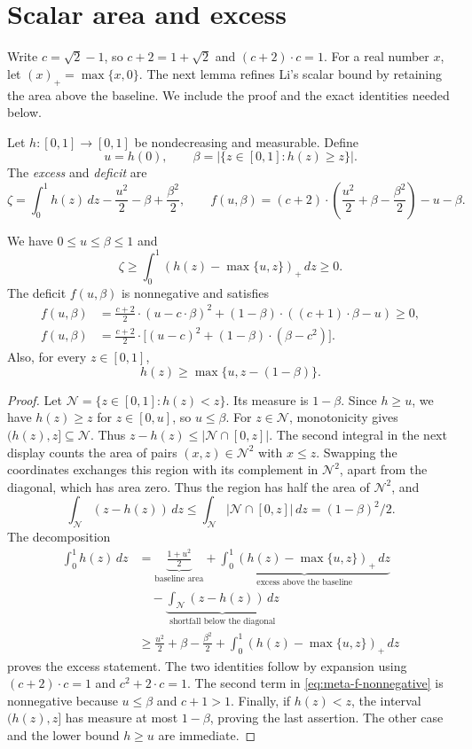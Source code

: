\section{Scalar area and excess}
\label{sec:meta-scalar}

Write $c=\sqrt2-1$, so $c+2=1+\sqrt2$ and $(c+2)\cdot c=1$.
For a real number $x$, let $(x)_+=\max\{x,0\}$.
The next lemma refines Li's scalar bound \cite[Claim 3.3]{Li2017} by
retaining the area above the baseline. We include the proof and the exact
identities needed below.

Let $h:[0,1]\to[0,1]$ be nondecreasing and measurable. Define
\[
 u=h(0),\qquad \beta=|\{z\in[0,1]:h(z)\ge z\}|.
\]
The \emph{excess} and \emph{deficit} are
\[
 \zeta=\int_0^1h(z)\,dz-\frac{u^2}{2}-\beta+\frac{\beta^2}{2},
 \qquad
 f(u,\beta)=(c+2)\cdot\left(\frac{u^2}{2}+\beta-\frac{\beta^2}{2}\right)-u-\beta.
\]

\begin{lemma}
\label{lem:meta-scalar-area}
We have $0\le u\le\beta\le1$ and
\[
 \zeta\ge\int_0^1(h(z)-\max\{u,z\})_+\,dz\ge0.
\]
The deficit $f(u,\beta)$ is nonnegative and satisfies
\begin{align}
 f(u,\beta)&=\frac{c+2}{2}\cdot(u-c\cdot\beta)^2+(1-\beta)\cdot((c+1)\cdot\beta-u)\ge0,
 \label{eq:meta-f-nonnegative}\\
 f(u,\beta)&=\frac{c+2}{2}\cdot\bigl[(u-c)^2+(1-\beta)\cdot(\beta-c^2)\bigr].
 \label{eq:meta-f-square}
\end{align}
Also, for every $z\in[0,1]$,
\[
 h(z)\ge\max\{u,z-(1-\beta)\}.
\]
\end{lemma}
\begin{proof}
Let $\mathcal N=\{z\in[0,1]:h(z)<z\}$. Its measure is $1-\beta$.
Since $h\ge u$, we have $h(z)\ge z$ for $z\in[0,u]$, so $u\le\beta$.
For $z\in\mathcal N$, monotonicity gives $(h(z),z]\subseteq\mathcal N$.
Thus $z-h(z)\le |\mathcal N\cap[0,z]|$.
The second integral in the next display counts the area of pairs $(x,z)\in\mathcal N^2$ with
$x\le z$. Swapping the coordinates exchanges this region with its
complement in $\mathcal N^2$, apart from the diagonal, which has area zero.
Thus the region has half the area of $\mathcal N^2$, and
\[
 \int_{\mathcal N}(z-h(z))\,dz\le
 \int_{\mathcal N}|\mathcal N\cap[0,z]|\,dz
 = (1-\beta)^2/2.
\]
The decomposition
\begin{align*}
 \int_0^1h(z)\,dz
 &=\underbrace{\frac{1+u^2}{2}}_{\text{baseline area}}
   +\underbrace{\int_0^1(h(z)-\max\{u,z\})_+\,dz}_{\text{excess above the baseline}}\\
 &\quad-\underbrace{\int_{\mathcal N}(z-h(z))\,dz}_{\text{shortfall below the diagonal}}\\
 &\ge\frac{u^2}{2}+\beta-\frac{\beta^2}{2}
      +\int_0^1(h(z)-\max\{u,z\})_+\,dz
\end{align*}
proves the excess statement. The two identities follow by expansion
using $(c+2)\cdot c=1$ and $c^2+2\cdot c=1$. The second term in
\eqref{eq:meta-f-nonnegative} is nonnegative because $u\le\beta$
and $c+1>1$. Finally, if $h(z)<z$, the interval $(h(z),z]$ has
measure at most $1-\beta$, proving the last assertion. The other case
and the lower bound $h\ge u$ are immediate.
\end{proof}

